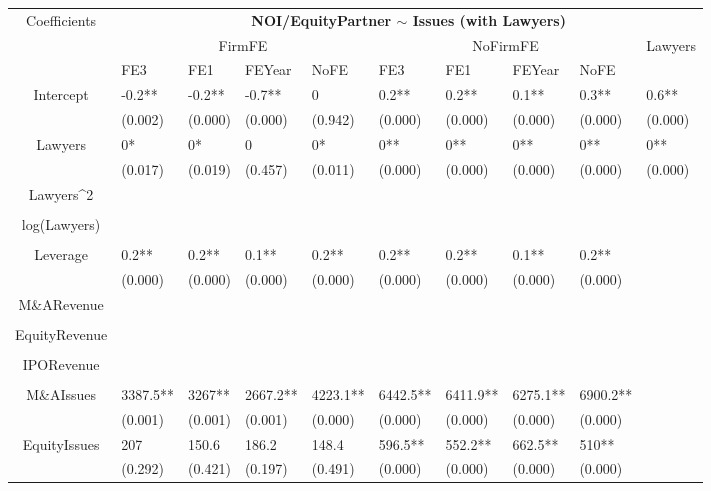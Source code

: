 \documentclass{article}
\begin{document}
\begin{table}[H]
\centering
\begin{tabular}{|clllllllll|}
\hline
\multirow{3}{*}{Coefficients} & \multicolumn{9}{c|}{\textbf{NOI/EquityPartner $\sim$ Issues (with Lawyers)}} \\
\cline{2-10}
& \multicolumn{4}{c}{FirmFE} & \multicolumn{4}{c}{NoFirmFE} & \multirow{2}{*}{Lawyers} \\
\cline{2-9}
& FE3 & FE1 & FEYear & NoFE & FE3 & FE1 & FEYear & NoFE &  \\
\hline
 
Intercept & -0.2** & -0.2** & -0.7** & 0 & 0.2** & 0.2** & 0.1** & 0.3** & 0.6** \\ 
   & (0.002) & (0.000) & (0.000) & (0.942) & (0.000) & (0.000) & (0.000) & (0.000) & (0.000) \\ 
  Lawyers & 0* & 0* & 0 & 0* & 0** & 0** & 0** & 0** & 0** \\ 
   & (0.017) & (0.019) & (0.457) & (0.011) & (0.000) & (0.000) & (0.000) & (0.000) & (0.000) \\ 
  Lawyers^2 &  &  &  &  &  &  &  &  &  \\ 
   &  &  &  &  &  &  &  &  &  \\ 
  log(Lawyers) &  &  &  &  &  &  &  &  &  \\ 
   &  &  &  &  &  &  &  &  &  \\ 
  Leverage & 0.2** & 0.2** & 0.1** & 0.2** & 0.2** & 0.2** & 0.1** & 0.2** &  \\ 
   & (0.000) & (0.000) & (0.000) & (0.000) & (0.000) & (0.000) & (0.000) & (0.000) &  \\ 
  M\&ARevenue &  &  &  &  &  &  &  &  &  \\ 
   &  &  &  &  &  &  &  &  &  \\ 
  EquityRevenue &  &  &  &  &  &  &  &  &  \\ 
   &  &  &  &  &  &  &  &  &  \\ 
  IPORevenue &  &  &  &  &  &  &  &  &  \\ 
   &  &  &  &  &  &  &  &  &  \\ 
  M\&AIssues & 3387.5** & 3267** & 2667.2** & 4223.1** & 6442.5** & 6411.9** & 6275.1** & 6900.2** &  \\ 
   & (0.001) & (0.001) & (0.001) & (0.000) & (0.000) & (0.000) & (0.000) & (0.000) &  \\ 
  EquityIssues & 207 & 150.6 & 186.2 & 148.4 & 596.5** & 552.2** & 662.5** & 510** &  \\ 
   & (0.292) & (0.421) & (0.197) & (0.491) & (0.000) & (0.000) & (0.000) & (0.000) &  \\ 

\end{tabular}
\end{table}
\end{document}
